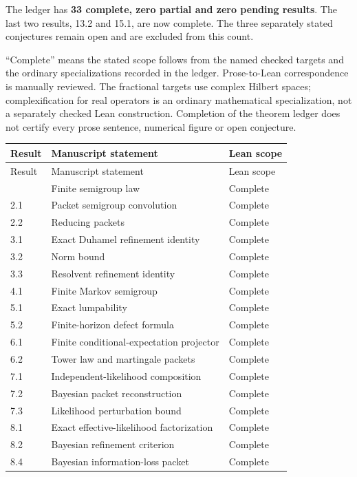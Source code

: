 \documentclass[11pt,letterpaper]{article}
\theoremstyle{plain}
\theoremstyle{plain}
\theoremstyle{plain}
\theoremstyle{definition}
\theoremstyle{definition}
\theoremstyle{definition}
\theoremstyle{definition}
\theoremstyle{definition}
\theoremstyle{remark}
\theoremstyle{remark}
\theoremstyle{remark}
\theoremstyle{remark}
\theoremstyle{remark}
\theoremstyle{remark}
\begin{document}
The ledger has \textbf{33 complete, zero partial and zero pending results}.
The last two results, 13.2 and 15.1, are now complete. The three separately stated
conjectures remain open and are excluded from this count.

``Complete'' means the stated scope follows from the named checked targets
and the ordinary specializations recorded in the ledger. Prose-to-Lean correspondence
is manually reviewed. The fractional targets use complex Hilbert spaces;
complexification for real operators is an ordinary mathematical specialization,
not a separately checked Lean construction. Completion of the theorem ledger does
not certify every prose sentence, numerical figure or open conjecture.

\small
\begin{longtable}{@{}p{}p{}p{}@{}}
\toprule Result & Manuscript statement & Lean scope\\
\midrule\endfirsthead
\toprule Result & Manuscript statement & Lean scope\\\midrule\endhead
\bottomrule\endfoot
1.2 & Finite semigroup law & Complete\\
2.1 & Packet semigroup convolution & Complete\\
2.2 & Reducing packets & Complete\\
3.1 & Exact Duhamel refinement identity & Complete\\
3.2 & Norm bound & Complete\\
3.3 & Resolvent refinement identity & Complete\\
4.1 & Finite Markov semigroup & Complete\\
5.1 & Exact lumpability & Complete\\
5.2 & Finite-horizon defect formula & Complete\\
6.1 & Finite conditional-expectation projector & Complete\\
6.2 & Tower law and martingale packets & Complete\\
7.1 & Independent-likelihood composition & Complete\\
7.2 & Bayesian packet reconstruction & Complete\\
7.3 & Likelihood perturbation bound & Complete\\
8.1 & Exact effective-likelihood factorization & Complete\\
8.2 & Bayesian refinement criterion & Complete\\
8.4 & Bayesian information-loss packet & Complete\\

\end{longtable}
\end{document}

